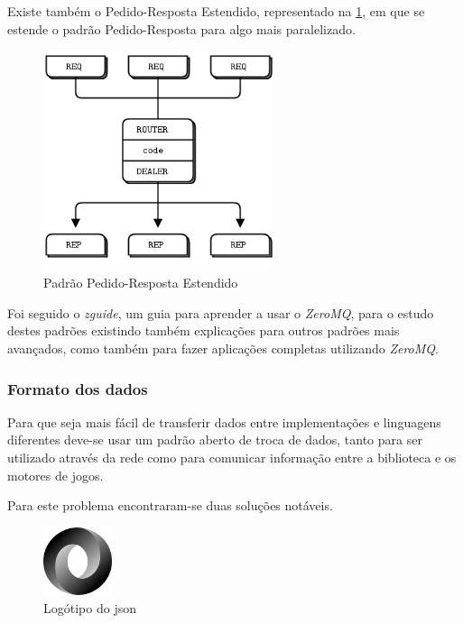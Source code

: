 Existe também o Pedido-Resposta Estendido, representado na \cref{fig:zmq_req-rep-ext}, em que se estende o padrão Pedido-Resposta para algo mais paralelizado.

\begin{figure}
    \centering
    \includegraphics[width=0.6\textwidth]{images/zeromq/req-rep-ext.png}
    \caption{Padrão Pedido-Resposta Estendido}
    \label{fig:zmq_req-rep-ext}
\end{figure}

Foi seguido o \textit{zguide}, um guia para aprender a usar o \textit{ZeroMQ}, para o estudo destes padrões existindo também explicações para outros padrões mais avançados, como também para fazer aplicações completas utilizando \textit{ZeroMQ}. \cite{zeromq_book}

\clearpage
\subsubsection{Formato dos dados}

Para que seja mais fácil de transferir dados entre implementações e linguagens diferentes deve-se usar um padrão aberto de troca de dados, tanto para ser utilizado através da rede como para comunicar informação entre a biblioteca e os motores de jogos.

Para este problema encontraram-se duas soluções notáveis.

\begin{figure}
    \centering
    \includegraphics[width=2cm]{images/json.png}
    \caption{Logótipo do \acrshort{json}}
    \label{fig:json}
\end{figure}

